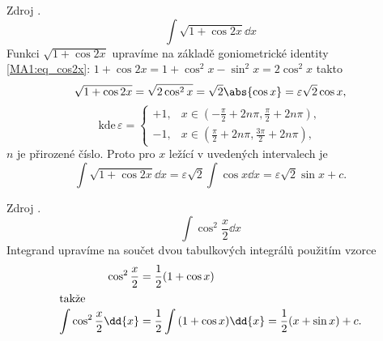       \begin{example}
        Zdroj \cite[s.~30]{Knichal}.
        \begin{equation}\label{MA:int_ex_04}
          \int{\sqrt{1+\cos2x}\dd{x}}
        \end{equation}
        Funkci $\sqrt{1+\cos2x}$ upravíme na základě goniometrické identity \ref{MA1:eq_cos2x}:
        \(1+\cos2x = 1+\cos^2x-\sin^2x=2\cos^2x\) takto
        \begin{equation*}
          \sqrt{1+\cos2x} =\sqrt{2\cos^2x} = \sqrt{2}\abs{\cos x} = \varepsilon\sqrt{2}\cos x, 
        \end{equation*}
        \begin{equation*}
          \text{kde}\,\varepsilon =
            \begin{cases} 
             +1, &  x\in \left(-\frac{\pi}{2}+2n\pi,\frac{\pi}{2}+2n\pi\right), \\
             -1, &  x\in \left(\frac{\pi}{2}+2n\pi,\frac{3\pi}{2}+2n\pi\right),
            \end{cases}
        \end{equation*}
        $n$ je přirozené číslo. Proto pro $x$ ležící v uvedených intervalech je
        \begin{equation*}
          \int\sqrt{1+\cos2x}\dd{x} = \varepsilon\sqrt{2}\int\cos x\dd{x} 
                                 = \varepsilon\sqrt{2}\sin x + c.
        \end{equation*}
      \end{example}
      
      \begin{example}Zdroj \cite[s.~30]{Knichal}.
        \begin{equation}\label{MA:int_ex_05}
          \int\cos^2\frac{x}{2}\dd{x}
        \end{equation}
        Integrand upravíme na součet dvou tabulkových integrálů použitím vzorce
        \begin{align*}
          \cos^2\frac{x}{2} &= \frac{1}{2}(1+\cos x)     \\ 
          \shortintertext{takže}
          \int{\cos^2\frac{x}{2}}\dd{x} 
                            &= \frac{1}{2}\int{(1+\cos x)}\dd{x} = \frac{1}{2}(x+\sin x) + c.
        \end{align*}          
      \end{example}
      

